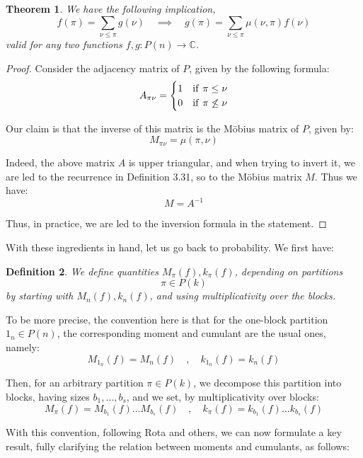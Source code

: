 \documentclass[12pt]{amsbook}
\newtheorem{theorem}{Theorem}[chapter]
\newtheorem{definition}[theorem]{Definition}
\begin{document}

\begin{theorem}
We have the following implication,
$$f(\pi)=\sum_{\nu\leq\pi}g(\nu)
\quad\implies\quad
g(\pi)=\sum_{\nu\leq\pi}\mu(\nu,\pi)f(\nu)$$
valid for any two functions $f,g:P(n)\to\mathbb C$.
\end{theorem}

\begin{proof}
Consider the adjacency matrix of $P$, given by the following formula:
$$A_{\pi\nu}=\begin{cases}
1&{\rm if}\ \pi\leq\nu\\
0&{\rm if}\ \pi\not\leq\nu
\end{cases}$$

Our claim is that the inverse of this matrix is the M\"obius matrix of $P$, given by:
$$M_{\pi\nu}=\mu(\pi,\nu)$$

Indeed, the above matrix $A$ is upper triangular, and when trying to invert it, we are led to the recurrence in Definition 3.31, so to the M\"obius matrix $M$. Thus we have:
$$M=A^{-1}$$

Thus, in practice, we are led to the inversion formula in the statement.
\end{proof}

With these ingredients in hand, let us go back to probability. We first have:


\begin{definition}
We define quantities $M_\pi(f),k_\pi(f)$, depending on partitions 
$$\pi\in P(k)$$
by starting with $M_n(f),k_n(f)$, and using multiplicativity over the blocks. 
\end{definition}

To be more precise, the convention here is that for the one-block partition $1_n\in P(n)$, the corresponding moment and cumulant are the usual ones, namely:
$$M_{1_n}(f)=M_n(f)\quad,\quad k_{1_n}(f)=k_n(f)$$

Then, for an arbitrary partition $\pi\in P(k)$, we decompose this partition into blocks, having sizes $b_1,\ldots,b_s$, and we set, by multiplicativity over blocks:
$$M_\pi(f)=M_{b_1}(f)\ldots M_{b_s}(f)\quad,\quad k_\pi(f)=k_{b_1}(f)\ldots k_{b_s}(f)$$

With this convention, following Rota and others, we can now formulate a key result, fully clarifying the relation between moments and cumulants, as follows:
\end{document}
